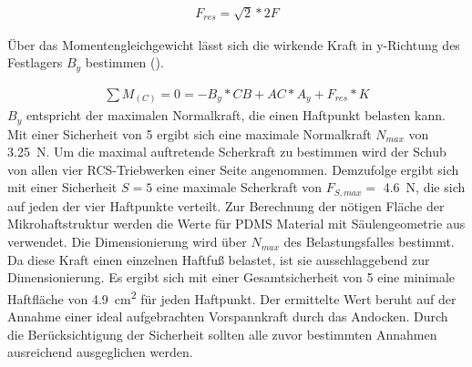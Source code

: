 	\begin{eqnarray}
			F_{res}=\sqrt{ 2 }*2F
	\end{eqnarray}

	Über das Momentengleichgewicht lässt sich die wirkende Kraft in y-Richtung des Festlagers $B_y$  bestimmen ().

\begin{eqnarray}
		\sum{  }{  }{ M_{(C)} }=0=-B_y*CB+AC*A_y+F_{res}*K
\end{eqnarray}
	$B_y$ entspricht der maximalen Normalkraft, die einen Haftpunkt belasten kann. Mit einer Sicherheit von \num{5} ergibt sich eine maximale Normalkraft $N_{max}$ von \SI{3,25}{\newton}. Um die maximal auftretende Scherkraft zu bestimmen wird der Schub von allen vier RCS-Triebwerken einer Seite angenommen. Demzufolge ergibt sich mit einer Sicherheit $S = 5$ eine maximale Scherkraft von $F_{S, max} =$ \SI{4,6}{\newton}, die sich auf jeden der vier Haftpunkte verteilt. Zur Berechnung der nötigen Fläche der Mikrohaftstruktur werden die Werte für PDMS Material mit Säulengeometrie aus \cite[Tabelle1, Seite 23]{Schwerter.} verwendet. Die Dimensionierung wird über $N_{max}$ des Belastungsfalles bestimmt. Da diese Kraft einen einzelnen Haftfuß belastet, ist sie ausschlaggebend zur Dimensionierung. Es ergibt sich mit einer Gesamtsicherheit von \num{5} eine minimale Haftfläche von \SI{4,9}{\centi\metre\squared} für jeden Haftpunkt. Der ermittelte Wert beruht auf der Annahme einer ideal aufgebrachten Vorspannkraft durch das Andocken. Durch die Berücksichtigung der Sicherheit sollten alle zuvor bestimmten Annahmen ausreichend ausgeglichen werden. 




		
